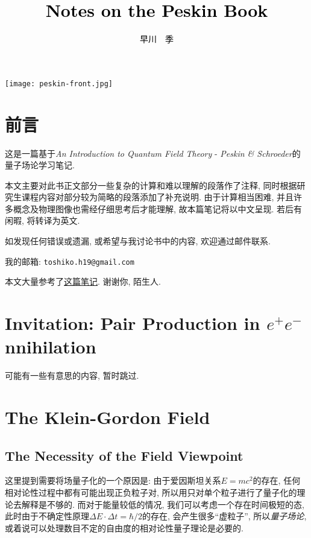 \documentclass[cn,hazy,blue,11pt,device=normal,chinesefont=founder]{elegantnote}
\title{\textcolor{black}{\Huge{Notes on the Peskin Book}}}
\author{\textcolor{black}{早川　季}}
\institute{}
\date{}
\begin{document}
\maketitle

\mbox{}

\centerline{
  \texttt{[image: peskin-front.jpg]}
}

\tableofcontents

\clearpage

\section*{前言}

这是一篇基于\textit{An Introduction to Quantum Field Theory} - \textit{Peskin \& Schroeder}的量子场论学习笔记. 

本文主要对此书正文部分一些复杂的计算和难以理解的段落作了注释, 同时根据研究生课程内容对部分较为简略的段落添加了补充说明. 由于计算相当困难, 并且许多概念及物理图像也需经仔细思考后才能理解, 故本篇笔记将以中文呈现. 若后有闲暇, 将转译为英文. 

如发现任何错误或遗漏, 或希望与我讨论书中的内容, 欢迎通过邮件联系. 

我的邮箱: \texttt{toshiko.h19@gmail.com}

本文大量参考了\href{http://gamebm.shoutwiki.com/wiki/Lecture_Notes_of_An_Introduction_to_Quantum_Field_Theory_by_M._Peskin_and_D._Schroeder}{这篇笔记}. 谢谢你, 陌生人. 

\clearpage

\section{Invitation: Pair Production in \texorpdfstring{$e^+e^-$} Annihilation}

可能有一些有意思的内容, 暂时跳过. 

\clearpage

\section{The Klein-Gordon Field}

\subsection{The Necessity of the Field Viewpoint}

这里提到需要将场量子化的一个原因是:  由于爱因斯坦关系$E = mc^2$的存在, 任何相对论性过程中都有可能出现正负粒子对, 所以用只对单个粒子进行了量子化的理论去解释是不够的. 而对于能量较低的情况, 我们可以考虑一个存在时间极短的态, 此时由于不确定性原理$\Delta E \cdot \Delta t = \hbar /2$的存在, 会产生很多“虚粒子”, 所以\textit{量子场论}, 或着说可以处理数目不定的自由度的相对论性量子理论是必要的. 
\end{document}
